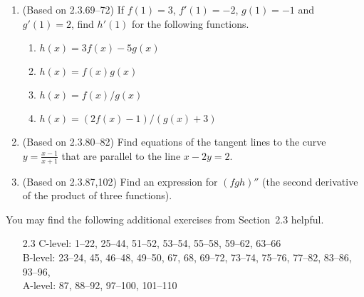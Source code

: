 \documentclass{article}
\newcommand{\ds}{\displaystyle}
\begin{document}
\begin{enumerate}
\item (Based on 2.3.69--72)
  If $f(1)=3$, $f'(1)=-2$, $g(1)=-1$ and $g'(1)=2$, find $h'(1)$ for 
  the following functions.
  \begin{multicols}{2}
  \begin{enumerate}
  \item $h(x)=3f(x)-5g(x)$
  \item $h(x)=f(x)g(x)$
  \item $h(x)=f(x)/g(x)$
  \item $h(x)=(2f(x)-1)/(g(x)+3)$
  \end{enumerate}
  \end{multicols}
\item (Based on 2.3.80--82)
  Find equations of the tangent lines to the curve $\ds y=\frac{x-1}{x+1}$
  that are parallel to the line $x-2y=2$.
\item (Based on 2.3.87,102) Find an expression for $(fgh)''$ (the second
  derivative of the product of three functions).
\end{enumerate}

\noindent
You may find the following additional exercises from Section~2.3 helpful.
\begin{itemize}
\item[2.3] 
  C-level: 1--22, 25--44, 51--52, 53--54, 55--58, 59--62, 63--66 \\
  B-level: 23--24, 45, 46--48, 49--50, 67, 68, 69--72, 73--74, 75--76,
  77--82, 83--86, 93--96, \\
  A-level: 87, 88--92, 97--100, 101--110
\end{itemize}
\end{document}
